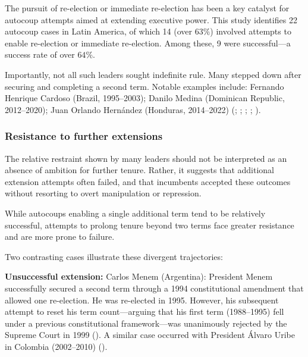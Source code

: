 \documentclass[
  12pt,
]{report}
\begin{document}
The pursuit of re-election or immediate re-election has been a key
catalyst for autocoup attempts aimed at extending executive power. This
study identifies 22 autocoup cases in Latin America, of which 14 (over
\(63\%\)) involved attempts to enable re-election or immediate
re-election. Among these, 9 were successful---a success rate of over
\(64\%\).

Importantly, not all such leaders sought indefinite rule. Many stepped
down after securing and completing a second term. Notable examples
include: Fernando Henrique Cardoso (Brazil, 1995--2003); Danilo Medina
(Dominican Republic, 2012--2020); Juan Orlando Hernández (Honduras,
2014--2022) (;
;
;
; ).

\subsubsection*{Resistance to further
extensions}\label{resistance-to-further-extensions}

The relative restraint shown by many leaders should not be interpreted
as an absence of ambition for further tenure. Rather, it suggests that
additional extension attempts often failed, and that incumbents accepted
these outcomes without resorting to overt manipulation or repression.

While autocoups enabling a single additional term tend to be relatively
successful, attempts to prolong tenure beyond two terms face greater
resistance and are more prone to failure.

Two contrasting cases illustrate these divergent trajectories:

\textbf{Unsuccessful extension:} Carlos Menem (Argentina): President
Menem successfully secured a second term through a 1994 constitutional
amendment that allowed one re-election. He was re-elected in 1995.
However, his subsequent attempt to reset his term count---arguing that
his first term (1988--1995) fell under a previous constitutional
framework---was unanimously rejected by the Supreme Court in 1999
(). A similar case occurred with
President Álvaro Uribe in Colombia (2002--2010)
().
\end{document}
